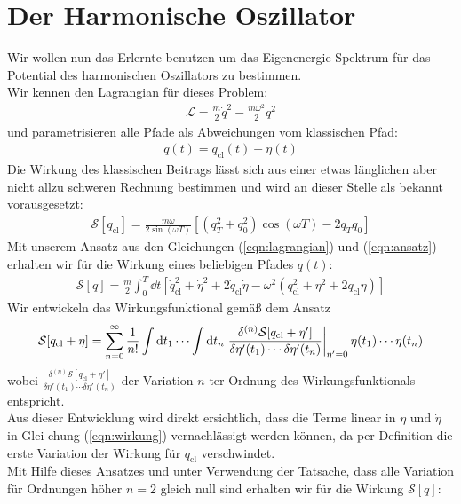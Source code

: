 \section{Der Harmonische Oszillator}
Wir wollen nun das Erlernte benutzen um das Eigenenergie-Spektrum für das  Potential des harmonischen Oszillators zu bestimmen. \\
Wir kennen den Lagrangian für dieses Problem: 
\begin{align}
	\mathcal{L} = \frac{m}{2}\dot{q}^2 - \frac{m\omega^2}{2}q^2 \label{eqn:lagrangian}
\end{align}
und parametrisieren alle Pfade als Abweichungen vom klassischen Pfad:
\begin{align}
	q(t) = q_{\text{cl}}(t) + \eta(t) \label{eqn:ansatz}
\end{align}
Die Wirkung des klassischen Beitrags lässt sich aus einer etwas länglichen aber nicht allzu schweren Rechnung bestimmen und wird an dieser Stelle als bekannt vorausgesetzt:
\begin{align}
	\mathcal{S}[q_{\text{cl}}] = \frac{m\omega}{2\sin(\omega T)}\left[(q_T^2+q_0^2)\cos(\omega T)- 2q_Tq_0\right]
\end{align}
Mit unserem Ansatz aus den Gleichungen (\ref{eqn:lagrangian}) und (\ref{eqn:ansatz}) erhalten wir für die Wirkung eines beliebigen Pfades $q(t)$:
\begin{align}
	\mathcal{S}[q] = \frac{m}{2} \int_0^T \dd t \left[\dot{q}_{\text{cl}}^2 + \dot{\eta}^2 + 2\dot{q}_{\text{cl}}\dot{\eta} - \omega^2\left(q_{\text{cl}}^2 + \eta^2 + 2q_{\text{cl}}\eta \right) \right] \label{eqn:wirkung}
\end{align}
Wir entwickeln das Wirkungsfunktional gemäß dem Ansatz
\begin{align}
	\mathcal{S}[q_{\text{cl}} + \eta] = \sum_{n=0}^{\infty} \frac{1}{n!} \int \dd t_1 \cdots \int \dd t_n \eval{\frac{\delta^{(n)}\mathcal{S}[q_{\text{cl}} + \eta']}{\delta\eta'(t_1)\cdots\delta\eta'(t_n)}}_{\eta' = 0} \eta(t_1)\cdots\eta(t_n)
\end{align}
wobei $\frac{\delta^{(n)}\mathcal{S}[q_{\text{cl}} + \eta']}{\delta\eta'(t_1)\cdots\delta\eta'(t_n)}$ der Variation $n$-ter Ordnung des Wirkungsfunktionals entspricht. \\
Aus dieser Entwicklung wird direkt ersichtlich, dass die Terme linear in $\eta$ und $\dot{\eta}$ in Glei-chung (\ref{eqn:wirkung}) vernachlässigt werden können, da per Definition die erste Variation der Wirkung für $q_{\text{cl}}$ verschwindet. \\
Mit Hilfe dieses Ansatzes und unter Verwendung der Tatsache, dass alle Variation für Ordnungen höher $n=2$ gleich null sind erhalten wir für die Wirkung $\mathcal{S}[q]$:
